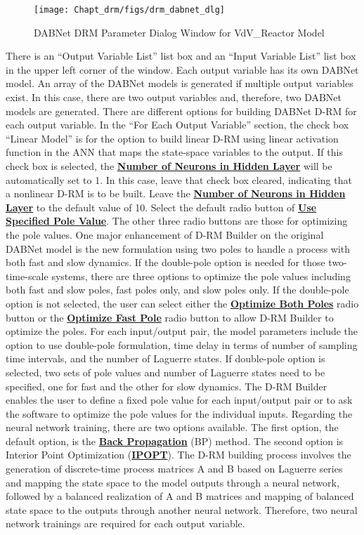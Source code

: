 \begin{enumerate}
	\begin{figure}[H]
		\begin{center}
			\texttt{[image: Chapt\_drm/figs/drm\_dabnet\_dlg]}
			\caption{DABNet DRM Parameter Dialog Window for VdV\_Reactor Model}
			\label{fig.drm_dabnet_dlg}
		\end{center}
	\end{figure}
	There is an ``Output Variable List'' list box and an ``Input Variable List'' list box in the upper left corner of the window.  Each output variable has its own DABNet model.  An array of the DABNet models is generated if multiple output variables exist.  In this case, there are two output variables and, therefore, two DABNet models are generated.  There are different options for building DABNet D-RM for each output variable.  In the ``For Each Output Variable'' section, the check box ``Linear Model'' is for the option to build linear D-RM using linear activation function in the ANN that maps the state-space variables to the output.  If this check box is selected, the \textbf{\underline{Number of Neurons in Hidden Layer}} will be automatically set to 1.  In this case, leave that check box cleared, indicating that a nonlinear D-RM is to be built. Leave the \textbf{\underline{Number of Neurons  in Hidden Layer}} to the default value of 10.  Select the default radio button of \textbf{\underline{Use Specified Pole Value}}.  The other three radio buttons are those for optimizing the pole values.  One major enhancement of D-RM Builder on the original DABNet model is the new formulation using two poles to handle a process with both fast and slow dynamics. If the double-pole option is needed for those two-time-scale systems, there are three options to optimize the pole values including both fast and slow poles, fast poles only, and slow poles only.  If the double-pole option is not selected, the user can select either the \textbf{\underline{Optimize Both Poles}} radio button or the \textbf{\underline{Optimize Fast Pole}} radio button to allow D-RM Builder to optimize the poles. For each input/output pair, the model parameters include the option to use double-pole formulation, time delay in terms of number of sampling time intervals, and the number of Laguerre states.  If double-pole option is selected, two sets of pole values and number of Laguerre states need to be specified, one for fast and the other for slow dynamics.  The D-RM Builder enables the user to define a fixed pole value for each input/output pair or to ask the software to optimize the pole values for the individual inputs.  Regarding the neural network training, there are two options available.  The first option, the default option, is the \textbf{\underline{Back Propagation}} (BP) method.  The second option is Interior Point Optimization (\textbf{\underline{IPOPT}}).  The D-RM building process involves the generation of discrete-time process matrices A and B based on Laguerre series and mapping the state space to the model outputs through a neural network, followed by a balanced realization of A and B matrices and mapping of balanced state space to the outputs through another neural network.  Therefore, two neural network trainings are required for each output variable.  
\end{enumerate}
